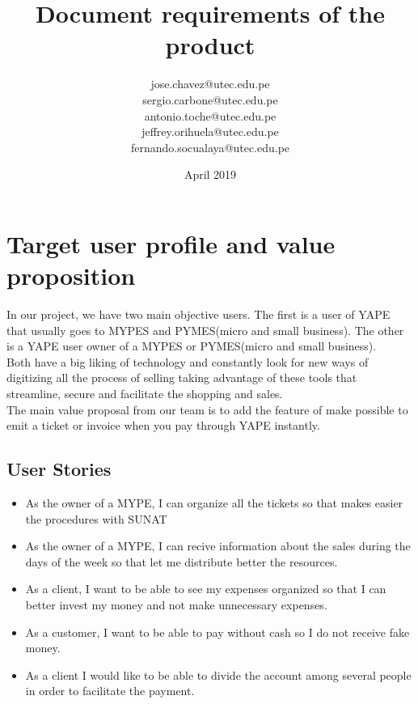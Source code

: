 \documentclass{article}
\title{Document requirements of the product}
\author{jose.chavez@utec.edu.pe \\ sergio.carbone@utec.edu.pe\\antonio.toche@utec.edu.pe\\jeffrey.orihuela@utec.edu.pe\\fernando.socualaya@utec.edu.pe}
\date{April 2019}
\begin{document}
\maketitle

\section{Target user profile and value proposition}
   In our project, we have two main objective users. The first is a user of YAPE that usually goes to MYPES and PYMES(micro and small business). The other is a YAPE user owner of a MYPES or PYMES(micro and small business).\\ Both have a big liking of technology and constantly look for new ways of digitizing all the process of selling taking advantage of these tools that streamline, secure and facilitate the shopping and sales.\\
   The main value proposal from our team is to add the feature of make possible to emit a ticket or invoice when you pay through YAPE instantly.
    \subsection{User Stories} 
    \begin{itemize}
    \item As the owner of a MYPE, I can organize all the tickets so that makes easier the procedures with SUNAT
    \item As the owner of a MYPE, I can recive information about the sales during the days of the week so that let me distribute better the resources.
    \item As a client, I want to be able to see my expenses organized so that I can better invest my money and not make unnecessary expenses.
    \item As a customer, I want to be able to pay without cash so I do not receive fake money.
    \item As a client I would like to be able to divide the account among several people in order to facilitate the payment.


    \end{itemize}
    
\end{document}
